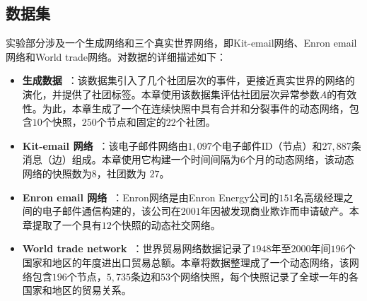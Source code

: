 \subsection{数据集}

实验部分涉及一个生成网络和三个真实世界网络，即Kit-email网络、Enron email网络和World trade网络。对数据的详细描述如下：

\begin{itemize}

\item \textbf{生成数据~\cite{greene2010tracking}}：该数据集引入了几个社团层次的事件，更接近真实世界的网络的演化，并提供了社团标签。本章使用该数据集评估社团层次异常参数$A$的有效性。为此，本章生成了一个在连续快照中具有合并和分裂事件的动态网络，包含$10$个快照，$250$个节点和固定的$22$个社团。

\item \textbf{Kit-email 网络~\cite{gorkedynamic}}：该电子邮件网络由$1,097$个电子邮件ID（节点）和$27,887$条消息（边）组成。本章使用它构建一个时间间隔为$6$个月的动态网络，该动态网络的快照数为$8$，社团数为 $27$。

\item \textbf{Enron email 网络~\cite{benston2002enron}}：Enron网络是由Enron Energy公司的$151$名高级经理之间的电子邮件通信构建的，该公司在$2001$年因被发现商业欺诈而申请破产。本章提取了一个具有$12$个快照的动态社交网络。

\item \textbf{World trade network~\cite{worldset2002}}：世界贸易网络数据记录了$1948$年至$2000$年间$196$个国家和地区的年度进出口贸易总额。本章将数据整理成了一个动态网络，该网络包含$196$个节点，$5,735$条边和$53$个网络快照，每个快照记录了全球一年的各国家和地区的贸易关系。
\end{itemize}




